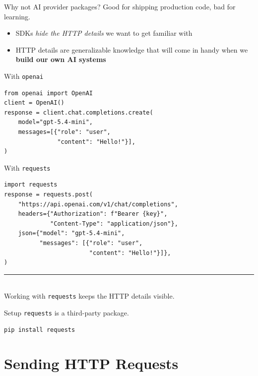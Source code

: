 \documentclass[aspectratio=169]{beamer}
\def\hr{\noindent\rule{\textwidth}{0.4pt}\\}
\begin{document}
\begin{frame}[fragile]{Why not AI provider packages?}
    Good for shipping production code, bad for learning.
    \begin{itemize}
      \item SDKs \textit{hide the HTTP details} we want to get familiar with
      \item HTTP details are generalizable knowledge that will come in handy when we \textbf{build our own AI systems}
    \end{itemize}

    \begin{minipage}[t]{0.45\textwidth}
        With \texttt{openai}
        \begin{verbatim}
from openai import OpenAI
client = OpenAI()
response = client.chat.completions.create(
    model="gpt-5.4-mini",
    messages=[{"role": "user",
               "content": "Hello!"}],
)
        \end{verbatim}
    \end{minipage}
    \hfill
    \begin{minipage}[t]{0.52\textwidth}
        With \texttt{requests}
        \begin{verbatim}
import requests
response = requests.post(
    "https://api.openai.com/v1/chat/completions",
    headers={"Authorization": f"Bearer {key}",
             "Content-Type": "application/json"},
    json={"model": "gpt-5.4-mini",
          "messages": [{"role": "user",
                        "content": "Hello!"}]},
)
        \end{verbatim}
    \end{minipage}

    \hr
    Working with \texttt{requests} keeps the HTTP details visible.
\note{
}
\end{frame}


\begin{frame}[fragile]{Setup}
    \texttt{requests} is a third-party package.
    \begin{verbatim}
pip install requests
    \end{verbatim}
\note{
}
\end{frame}



\section{Sending HTTP Requests}
\end{document}
